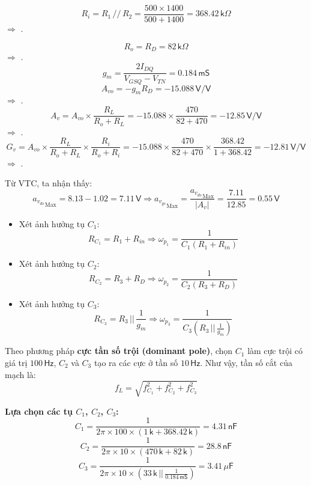 
\[
R_{i}=R_{1}\,//\,R_{2}=\frac{500\times1400}{500+1400}=368.42\,\textsf{k}\Omega
\]
$\Rightarrow$ .

\[
R_{o}=R_{D}=82\,\textsf{k}\Omega
\]
$\Rightarrow$ .
\[
g_{m}=\frac{2I_{DQ}}{V_{GSQ}-V_{TN}}=0.184\,\textsf{mS}
\]
\[
A_{vo}=-g_{m}R_{D}=-15.088\,\textsf{V/V}
\]
$\Rightarrow$ .
\[
A_{v}=A_{vo}\times\frac{R_{L}}{R_{o}+R_{L}}=-15.088\times\frac{470}{82+470}=-12.85\,\textsf{V/V}
\]
$\Rightarrow$ .
\[
G_{v}=A_{vo}\times\frac{R_{L}}{R_{o}+R_{L}}\times\frac{R_{i}}{R_{o}+R_{i}}=-15.088\times\frac{470}{82+470}\times\frac{368.42}{1+368.42}=-12.81\,\textsf{V/V}
\]
$\Rightarrow$ .

Từ VTC, ta nhận thấy:
\[
{a_{v_{ds}}}_{\text{Max}}=8.13-1.02=7.11\,\textsf{V}
\Rightarrow {a_{v_{gs}}}_{\text{Max}}=\frac{{a_{v_{ds}}}_{\text{Max}}}{\left|A_{v}\right|}=\frac{7.11}{12.85}=0.55\,\textsf{V}
\]


\begin{itemize}[label=-]
	\item Xét ảnh hưởng tụ $C_{1}$: 
	\[
	R_{C_{1}}=R_{1}+R_{in}
	\Longrightarrow \omega_{p_{1}}=\frac{1}{C_{1}(R_{1}+R_{in})}
	\]
	
	\item Xét ảnh hưởng tụ $C_{2}$: 
	\[
	R_{C_{2}}=R_{3}+R_{D}
	\Longrightarrow \omega_{p_{2}}=\frac{1}{C_{2}(R_{3}+R_{D})}
	\]
	
	\item Xét ảnh hưởng tụ $C_{3}$: 
	\[
	R_{C_{3}}=R_{3}\,||\,\frac{1}{g_{m}}
	\Longrightarrow \omega_{p_{3}}=\frac{1}{C_{3}\left(R_{3}\,||\,\frac{1}{g_{m}}\right)}
	\]
\end{itemize}

Theo phương pháp \textbf{cực tần số trội (dominant pole)}, chọn $C_{1}$ làm cực trội có giá trị $100\,\textsf{Hz}$, 
$C_{2}$ và $C_{3}$ tạo ra các cực ở tần số $10\,\textsf{Hz}$.  
Như vậy, tần số cắt của mạch là:
\[
f_{L}=\sqrt{f_{C_{1}}^{2}+f_{C_{2}}^{2}+f_{C_{3}}^{2}}
\]

\textbf{Lựa chọn các tụ $C_{1}$, $C_{2}$, $C_{3}$:}
\[
C_{1}=\frac{1}{2\pi\times100\times\left(1\,\textsf{k}+368.42\,\textsf{k}\right)}=4.31\,\textsf{nF}
\]
\[
C_{2}=\frac{1}{2\pi\times10\times(470\,\textsf{k}+82\,\textsf{k})}=28.8\,\textsf{nF}
\]
\[
C_{3}=\frac{1}{2\pi\times10\times\left(33\,\textsf{k}\,||\,\frac{1}{0.184\,\textsf{mS}}\right)}=3.41\,\mu\textsf{F}
\]

